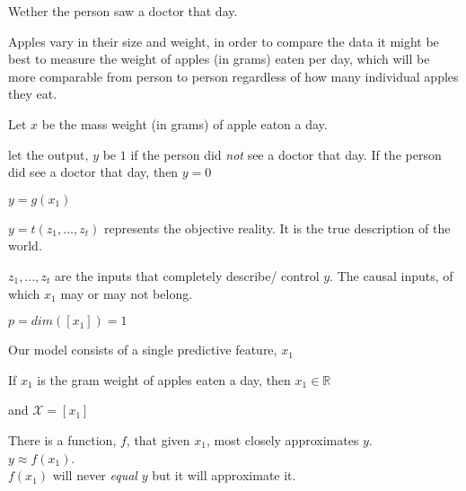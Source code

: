\documentclass[12pt]{article}
\begin{document}
\begin{enumerate}
Wether the person saw a doctor that day.


Apples vary in their size and weight, in order to compare the data it might be best to 
measure the weight of apples (in grams) eaten per day, which will be more comparable from person
to person regardless of how many individual apples they eat.

Let $x$ be the mass weight (in grams) of apple eaton a day.


let the output, $y$ be $1$ if the person did \emph{not} see a doctor that day. If the person did see a doctor that day, then $y = 0$ 



$y=g(x_1)$


$y = t(z_1, \ldots, z_t)$ represents the objective reality. It is the true description of the world.

$z_1, \ldots, z_t$ are the inputs that completely describe/ control $y$. The causal inputs, of which $x_1$ may or may not belong.



$p = dim([x_1]) = 1$

Our model consists of a single predictive feature, $x_1$


If $x_1$ is the gram weight of apples eaten a day, then $x_1\in\mathbb{R}$

and $\mathcal{X} = [x_1]$

There is a function, $f$, that given $x_1$, most closely approximates $y$.\\
$y \approx f(x_1)$. \\
$f(x_1)$ will never \emph{equal} $y$ but it will approximate it.


\end{enumerate}
\end{document}
